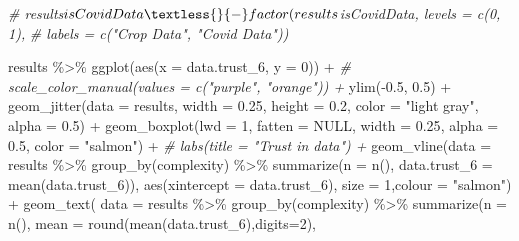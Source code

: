 \documentclass[
]{article}
\newenvironment{Shaded}{\begin{snugshade}}{\end{snugshade}}
\newcommand{\AttributeTok}[1]{\textcolor[rgb]{0.77,0.63,0.00}{#1}}
\newcommand{\CommentTok}[1]{\textcolor[rgb]{0.56,0.35,0.01}{\textit{#1}}}
\newcommand{\ConstantTok}[1]{\textcolor[rgb]{0.00,0.00,0.00}{#1}}
\newcommand{\DecValTok}[1]{\textcolor[rgb]{0.00,0.00,0.81}{#1}}
\newcommand{\FloatTok}[1]{\textcolor[rgb]{0.00,0.00,0.81}{#1}}
\newcommand{\FunctionTok}[1]{\textcolor[rgb]{0.00,0.00,0.00}{#1}}
\newcommand{\NormalTok}[1]{#1}
\newcommand{\SpecialCharTok}[1]{\textcolor[rgb]{0.00,0.00,0.00}{#1}}
\newcommand{\StringTok}[1]{\textcolor[rgb]{0.31,0.60,0.02}{#1}}
\begin{document}
\begin{Shaded}
\begin{Highlighting}[]
\CommentTok{\# results$isCovidData \textless{}{-} factor(results$isCovidData, levels = c(0, 1),}
\CommentTok{\#                   labels = c("Crop Data", "Covid Data"))}

\NormalTok{results }\SpecialCharTok{\%\textgreater{}\%}
  \FunctionTok{ggplot}\NormalTok{(}\FunctionTok{aes}\NormalTok{(}\AttributeTok{x =}\NormalTok{ data.trust\_6, }\AttributeTok{y =} \DecValTok{0}\NormalTok{)) }\SpecialCharTok{+}
  \CommentTok{\# scale\_color\_manual(values = c("purple", "orange")) +}
  \FunctionTok{ylim}\NormalTok{(}\SpecialCharTok{{-}}\FloatTok{0.5}\NormalTok{, }\FloatTok{0.5}\NormalTok{) }\SpecialCharTok{+}
  \FunctionTok{geom\_jitter}\NormalTok{(}\AttributeTok{data =}\NormalTok{ results, }\AttributeTok{width =} \FloatTok{0.25}\NormalTok{, }\AttributeTok{height =} \FloatTok{0.2}\NormalTok{, }\AttributeTok{color =} \StringTok{"light gray"}\NormalTok{, }\AttributeTok{alpha =} \FloatTok{0.5}\NormalTok{) }\SpecialCharTok{+}
  \FunctionTok{geom\_boxplot}\NormalTok{(}\AttributeTok{lwd =} \DecValTok{1}\NormalTok{, }\AttributeTok{fatten =} \ConstantTok{NULL}\NormalTok{, }\AttributeTok{width =} \FloatTok{0.25}\NormalTok{, }\AttributeTok{alpha =} \FloatTok{0.5}\NormalTok{, }\AttributeTok{color =} \StringTok{"salmon"}\NormalTok{) }\SpecialCharTok{+}
  \CommentTok{\# labs(title = "Trust in data") + }
  \FunctionTok{geom\_vline}\NormalTok{(}\AttributeTok{data =}\NormalTok{ results }\SpecialCharTok{\%\textgreater{}\%} 
                \FunctionTok{group\_by}\NormalTok{(complexity) }\SpecialCharTok{\%\textgreater{}\%}
                \FunctionTok{summarize}\NormalTok{(}\AttributeTok{n =} \FunctionTok{n}\NormalTok{(), }
                          \AttributeTok{data.trust\_6 =} \FunctionTok{mean}\NormalTok{(data.trust\_6)), }
              \FunctionTok{aes}\NormalTok{(}\AttributeTok{xintercept =}\NormalTok{ data.trust\_6), }\AttributeTok{size =} \DecValTok{1}\NormalTok{,}\AttributeTok{colour =} \StringTok{"salmon"}\NormalTok{) }\SpecialCharTok{+}
  \FunctionTok{geom\_text}\NormalTok{( }\AttributeTok{data =}\NormalTok{ results }\SpecialCharTok{\%\textgreater{}\%} 
                \FunctionTok{group\_by}\NormalTok{(complexity) }\SpecialCharTok{\%\textgreater{}\%}
                \FunctionTok{summarize}\NormalTok{(}\AttributeTok{n =} \FunctionTok{n}\NormalTok{(), }
                           \AttributeTok{mean =} \FunctionTok{round}\NormalTok{(}\FunctionTok{mean}\NormalTok{(data.trust\_6),}\AttributeTok{digits=}\DecValTok{2}\NormalTok{),}

\end{Highlighting}
\end{Shaded}
\end{document}
